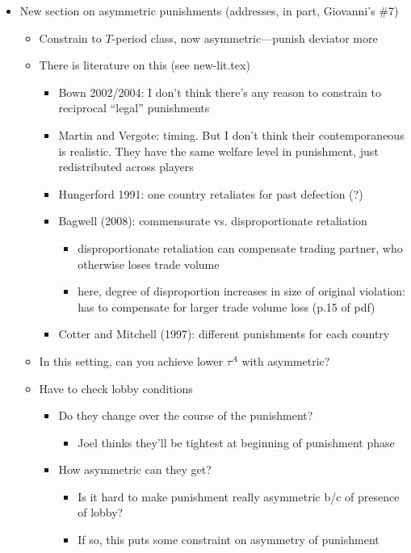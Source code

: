 \documentclass[12pt]{article}
\begin{document}
\begin{itemize}
	\item New section on asymmetric punishments (addresses, in part, Giovanni's $\#$7)
		\begin{itemize}
			\item Constrain to $T$-period class, now asymmetric---punish deviator more
			\item There is literature on this (see new-lit.tex)
				\begin{itemize}
					\item Bown 2002/2004: I don't think there's any reason to constrain to reciprocal ``legal'' punishments
					\item Martin and Vergote: timing. But I don't think their contemporaneous is realistic. They have the same welfare level in punishment, just redistributed across players
					\item Hungerford 1991: one country retaliates for past defection (?)
					\item Bagwell (2008): commensurate vs. disproportionate retaliation
						\begin{itemize}
							\item disproportionate retaliation can compensate trading partner, who otherwise loses trade volume
							\item here, degree of disproportion increases in size of original violation: has to compensate for larger trade volume loss (p.15 of pdf)
						\end{itemize}
					\item Cotter and Mitchell (1997): different punishments for each country
				\end{itemize}
			\item In this setting, can you achieve lower $\tau^A$ with asymmetric?
			\item Have to check lobby conditions
				\begin{itemize}
					\item Do they change over the course of the punishment?
						\begin{itemize}
							\item Joel thinks they'll be tightest at beginning of punishment phase
						\end{itemize}
					\item How asymmetric can they get?
						\begin{itemize}
							\item Is it hard to make punishment really asymmetric b/c of presence of lobby?
							\item If so, this puts some constraint on asymmetry of punishment
						\end{itemize}
				\end{itemize}
		\end{itemize}
	

\end{itemize}
\end{document}
